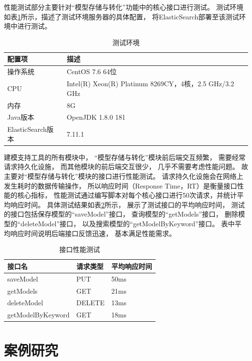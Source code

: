 性能测试部分主要针对“模型存储与转化”功能中的核心接口进行测试。
测试环境如表\ref{testcase5}所示，描述了测试环境服务器的具体配置，
将ElasticSearch部署至该测试环境中进行测试。

{\footnotesize
\begin{longtable}[h]{m{100pt}|m{285pt}}
    \caption[测试环境]{测试环境} \label{testcase5} \\
        \hline  
        配置项&描述\\
        \hline
        操作系统&CentOS 7.6 64位\\
        \hline
        CPU&Intel(R) Xeon(R) Platinum 8269CY，4核，2.5 GHz/3.2 GHz\\
        \hline
        内存&8G\\
        \hline
        Java版本& OpenJDK 1.8.0 181\\
        \hline
        ElasticSearch版本& 7.11.1\\
        \hline
\end{longtable} 
}

建模支持工具的所有模块中，
“模型存储与转化”模块前后端交互频繁，
需要经常请求持久化设施，
而其他模块的前后端交互很少，
几乎不需要考虑性能问题。
故主要对“模型存储与转化”模块的接口进行性能测试。
请求持久化设施会在网络上发生耗时的数据传输操作，
所以响应时间（Response Time，RT）是衡量接口性能的核心指标，
性能测试通过编写脚本对每个核心接口进行50次请求，并统计平均响应时间。
具体测试结果如表\ref{testcase6}所示，
展示了测试接口的平均响应时间，
测试的接口包括保存模型的“saveModel”接口，
查询模型的“getModels”接口，
删除模型的“deleteModel”接口，
以及搜索模型的“getModelByKeyword”接口。
表中平均响应时间说明后端接口反馈迅速，
基本满足性能需求。


{\footnotesize
\begin{longtable}[]{m{130pt}|m{100pt}|m{140pt}}
    \caption[接口性能测试]{接口性能测试} \label{testcase6} \\
        \hline  
        接口名&请求类型&平均响应时间\\
        \hline
        saveModel&PUT&50ms\\
        \hline
        getModels&GET&21ms\\
        \hline
        deleteModel&DELETE&13ms\\
        \hline
        getModelByKeyword&GET&18ms\\
        \hline
\end{longtable} 
}

\section{案例研究}

